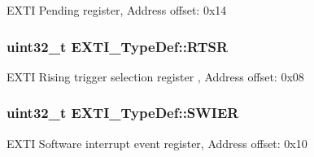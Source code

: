 E\-X\-T\-I Pending register, Address offset\-: 0x14 \hypertarget{struct_e_x_t_i___type_def_ac019d211d8c880b327a1b90a06cc0675}{
\subsubsection[{R\-T\-S\-R}]{ uint32\-\_\-t E\-X\-T\-I\-\_\-\-Type\-Def\-::\-R\-T\-S\-R}}\label{struct_e_x_t_i___type_def_ac019d211d8c880b327a1b90a06cc0675}
E\-X\-T\-I Rising trigger selection register , Address offset\-: 0x08 \hypertarget{struct_e_x_t_i___type_def_a5c1f538e64ee90918cd158b808f5d4de}{
\subsubsection[{S\-W\-I\-E\-R}]{ uint32\-\_\-t E\-X\-T\-I\-\_\-\-Type\-Def\-::\-S\-W\-I\-E\-R}}\label{struct_e_x_t_i___type_def_a5c1f538e64ee90918cd158b808f5d4de}
E\-X\-T\-I Software interrupt event register, Address offset\-: 0x10 

